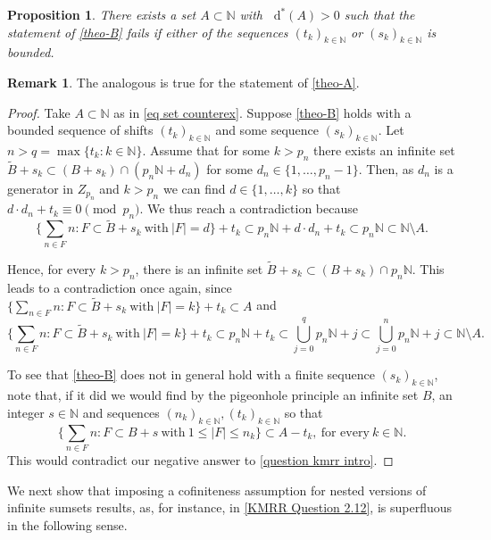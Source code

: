 \documentclass[letter, 11pt]{article}
\newtheorem{prop}[theo]{Proposition}
\theoremstyle{definition}
\newtheorem*{remark*}{Remark}
\theoremstyle{plain}
\newcommand{\N}{\mathbb{N}}
\newcommand*\diff{\mathop{}\!\mathrm{d}}
\newcommand{\1}{\mathbbm{1}}
\begin{document}
\begin{prop}
There exists a set $A\subset\N$ with $\diff^*(A)>0$ such that the statement of \cref{theo-B} fails if either of the sequences $(t_k)_{k\in \N}$ or $(s_k)_{k\in \N}$ is bounded.     
\end{prop}
\begin{remark*}
The analogous is true for the statement of \cref{theo-A}.  
\end{remark*}

\begin{proof}
Take $A\subset \N$ as in \eqref{eq set counterex}.
Suppose \cref{theo-B} holds with a bounded 
sequence of shifts $(t_k)_{k\in \N}$ and some sequence $(s_k)_{k\in \N}$. Let $n>q=\max\{t_k:k\in \N\}$. Assume that for some $k>p_n$ there exists an infinite set $\tilde{B}+s_k\subset (B+s_k)\cap (p_n\N+d_n)$ for some $d_n\in \{1,\ldots,p_n-1\}$. Then, as $d_n$ is a generator in $Z_{p_n}$ and $k>p_n$ we can find $d\in \{1,\ldots,k\}$ so that $d\cdot d_n +t_k\equiv 0 \pmod{p_n}$. We thus reach a contradiction because
$$ \bigg\{\sum_{n\in F} n : F\subset \tilde{B}+s_k\ \text{with}\ |F|=d\bigg\}+t_k \subset p_n\N+d\cdot d_n+t_k \subset p_n\N \subset \N\setminus A. $$

Hence, for every $k>p_n$, there is an infinite set $\tilde{B}+s_k\subset (B+s_k)\cap p_n\N$. This leads to a contradiction once again, since $\{\sum_{n\in F} n : F\subset \tilde{B}+s_k\ \text{with}\ |F|=k\}+t_k \subset A$ and
$$\bigg\{\sum_{n\in F} n : F\subset \tilde{B}+s_k\ \text{with}\ |F|=k\bigg\}+t_k \subset p_n\N+t_k \subset \bigcup_{j=0}^q p_n\N+j \subset \bigcup_{j=0}^n p_n\N+j \subset \N\setminus A.$$

To see that 
\cref{theo-B} does not in general hold with a finite sequence 
$(s_k)_{k\in \N}$, note that, if it did we would find by the pigeonhole principle an infinite set $B$, an integer $s\in \N$ and sequences $(n_k)_{k\in \N},(t_k)_{k\in \N}$ so that 
$$\bigg\{\sum_{n\in F} n: F\subset B+s\ \text{with}\ 1\leq |F| \leq n_k\bigg\} \subset A-t_k,\ \text{for every}\ k\in \N.$$
This would contradict our negative answer to \cref{question kmrr intro}.    
\end{proof}


We next show that imposing a cofiniteness assumption for nested versions of 
infinite sumsets results, as, for instance, in \cref{KMRR Question 2.12}, is 
superfluous in the following sense. 
\end{document}
